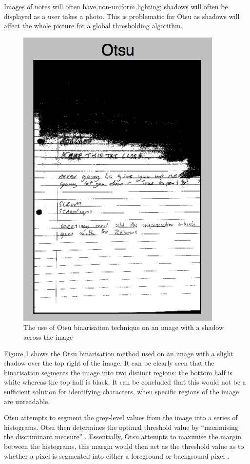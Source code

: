 Images of notes will often have non-uniform lighting; shadows will often be displayed as a user takes a photo. This is problematic for Otsu as shadows will affect the whole picture for a global thresholding algorithm.

\begin{figure}[H]
  \centering
  \includegraphics{images/OTSU}
  \caption{The use of Otsu binarisation technique on an image with a shadow across the image}
  \label{fig:OTSU}
\end{figure}

Figure \ref{fig:OTSU} shows the Otsu binarisation method used on an image with a slight shadow over the top right of the image. It can be clearly seen that the binarisation segments the image into two distinct regions: the bottom half is white whereas the top half is black. It can be concluded that this would not be a sufficient solution for identifying characters, when specific regions of the image are unreadable.

Otsu attempts to segment the grey-level values from the image into a series of histograms. Otsu then determines the optimal threshold value by ``maximising the discriminant measure'' \cite{citeulike:2917492}. Essentially, Otsu attempts to maximise the margin between the histograms, this margin would then act as the threshold value as to whether a pixel is segmented into either a foreground or background pixel \cite{citeulike:14021372}.

